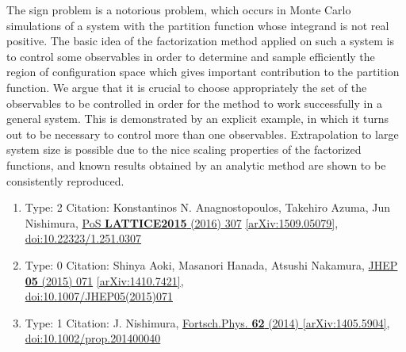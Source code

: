 \documentclass[a4paper,10pt]{article}
\begin{document}
\begin{enumerate}
The sign problem is a notorious problem, which occurs in Monte Carlo simulations of a system with the partition function whose integrand is not real positive. The basic idea of the factorization method applied on such a system is to control some observables in order to determine and sample efficiently the region of configuration space which gives important contribution to the partition function. We argue that it is crucial to choose appropriately the set of the observables to be controlled in order for the method to work successfully in a general system. This is demonstrated by an explicit example, in which it turns out to be necessary to control more than one observables. Extrapolation to large system size is possible due to the nice scaling properties of the factorized functions, and known results obtained by an analytic method are shown to be consistently reproduced.
\begin{enumerate}
  \item Type: 2 Citation: Konstantinos N. Anagnostopoulos, Takehiro Azuma, Jun Nishimura, \href{https://www.doi.org/10.22323/1.251.0307}{PoS {\bf LATTICE2015} (2016) 307}  \href{https://arxiv.org/abs/1509.05079}{[arXiv:1509.05079]},\\\href{https://www.doi.org/10.22323/1.251.0307}{doi:10.22323/1.251.0307}
  \item Type: 0 Citation: Shinya Aoki, Masanori Hanada, Atsushi Nakamura, \href{https://www.doi.org/10.1007/JHEP05(2015)071}{JHEP {\bf 05} (2015) 071}  \href{https://arxiv.org/abs/1410.7421}{[arXiv:1410.7421]},\\\href{https://www.doi.org/10.1007/JHEP05(2015)071}{doi:10.1007/JHEP05(2015)071}
  \item Type: 1 Citation: J. Nishimura, \href{https://www.doi.org/10.1002/prop.201400040}{Fortsch.Phys. {\bf 62} (2014) }  \href{https://arxiv.org/abs/1405.5904}{[arXiv:1405.5904]},\\\href{https://www.doi.org/10.1002/prop.201400040}{doi:10.1002/prop.201400040}

\end{enumerate}
\end{enumerate}
\end{document}

